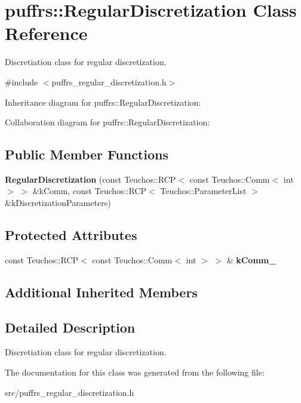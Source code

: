 \hypertarget{classpuffrs_1_1RegularDiscretization}{}\section{puffrs\+:\+:Regular\+Discretization Class Reference}
\label{classpuffrs_1_1RegularDiscretization}


Discretiation class for regular discretization.  




{\ttfamily \#include $<$puffrs\+\_\+regular\+\_\+discretization.\+h$>$}



Inheritance diagram for puffrs\+:\+:Regular\+Discretization\+:


Collaboration diagram for puffrs\+:\+:Regular\+Discretization\+:
\subsection*{Public Member Functions}
\begin{DoxyCompactItemize}
\item 
\mbox{\label{classpuffrs_1_1RegularDiscretization_adb66672889168f2829fd7d8b1cc5faee}} 
{\bfseries Regular\+Discretization} (const Teuchos\+::\+R\+CP$<$ const Teuchos\+::\+Comm$<$ int $>$ $>$ \&k\+Comm, const Teuchos\+::\+R\+CP$<$ Teuchos\+::\+Parameter\+List $>$ \&k\+Discretization\+Parameters)
\end{DoxyCompactItemize}
\subsection*{Protected Attributes}
\begin{DoxyCompactItemize}
\item 
\mbox{\label{classpuffrs_1_1RegularDiscretization_a5306dd2eda5b9c75850e889e6b0a2b54}} 
const Teuchos\+::\+R\+CP$<$ const Teuchos\+::\+Comm$<$ int $>$ $>$ \& {\bfseries k\+Comm\+\_\+}
\end{DoxyCompactItemize}
\subsection*{Additional Inherited Members}


\subsection{Detailed Description}
Discretiation class for regular discretization. 

The documentation for this class was generated from the following file\+:\begin{DoxyCompactItemize}
\item 
src/puffrs\+\_\+regular\+\_\+discretization.\+h\end{DoxyCompactItemize}
